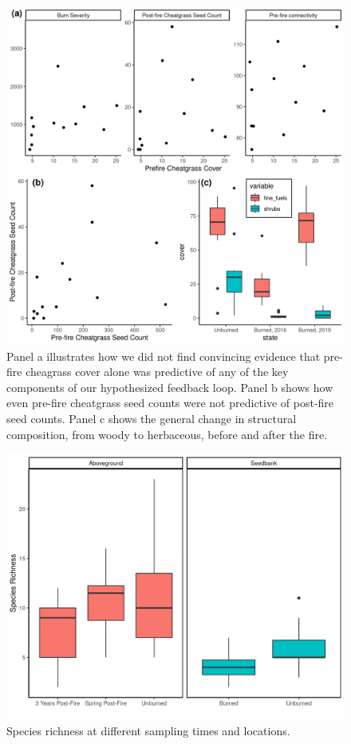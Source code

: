 \documentclass[
  12pt,
]{article}
\begin{document}
\newpage

\begin{figure}
\centering
\includegraphics{images/revresp1.png}
\caption{Panel a illustrates how we did not find convincing evidence
that pre-fire cheagrass cover alone was predictive of any of the key
components of our hypothesized feedback loop. Panel b shows how even
pre-fire cheatgrass seed counts were not predictive of post-fire seed
counts. Panel c shows the general change in structural composition, from
woody to herbaceous, before and after the fire.}
\end{figure}

\newpage

\begin{figure}
\centering
\includegraphics{images/richness_fig.png}
\caption{Species richness at different sampling times and locations.}
\end{figure}
\end{document}
